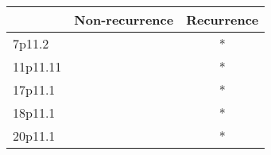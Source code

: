 \begin{tabular}{lcc}
\toprule
{} & Non-recurrence & Recurrence \\
\midrule
7p11.2   &                &          * \\
11p11.11 &                &          * \\
17p11.1  &                &          * \\
18p11.1  &                &          * \\
20p11.1  &                &          * \\
\bottomrule
\end{tabular}
